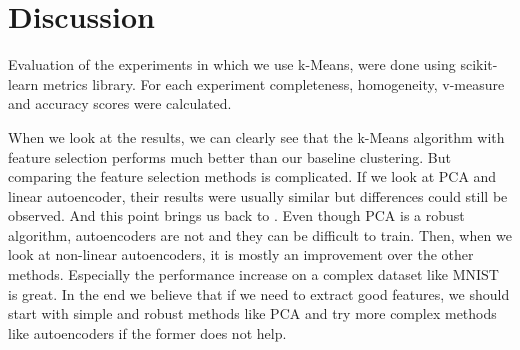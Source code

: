 \documentclass[journal]{IEEEtran}
\begin{document}
\section{Discussion}

Evaluation of the experiments in which we use k-Means, were done using scikit-learn metrics library. For each experiment completeness, homogeneity, v-measure and accuracy scores were calculated.\par
When we look at the results, we can clearly see that the k-Means algorithm with feature selection performs much better than our baseline clustering. But comparing the feature selection methods is complicated. If we look at PCA and linear autoencoder, their results were usually similar but differences could still be observed. And this point brings us back to \cite{hinton2006reducing}. Even though PCA is a robust algorithm, autoencoders are not and they can be difficult to train. Then, when we look at non-linear autoencoders, it is mostly an improvement over the other methods. Especially the performance increase on a complex dataset like MNIST is great. In the end we believe that if we need to extract good features, we should start with simple and robust methods like PCA and try more complex methods like autoencoders if the former does not help.\par
\end{document}
